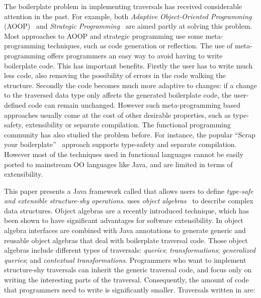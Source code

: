 The boilerplate problem in implementing traversals has
received considerable attention in the past. For example, both
\emph{Adaptive Object-Oriented Programming} (AOOP)~\cite{DemeterBook}
and \emph{Strategic
  Programming}~\cite{borovansky1996elan,visser1998core}
are aimed partly at solving this problem. Most approaches to AOOP and
strategic programming use some meta-programming techniques, such as
code generation or reflection. The use of meta-programming offers
programmers an easy way to avoid having to write boilerplate code.
This has important benefits. Firstly the user has
to write much less code, also removing the possibility of errors in
the code walking the structure. Secondly the code becomes much more
adaptive to changes: if a change to the traversed data type  only affects the generated boilerplate code,  the user-defined code
can remain unchanged.  However such
meta-programming based approaches  usually come at the cost of
other desirable properties, such as type-safety, extensibility or
separate compilation. The functional programming community has also
studied the problem before. For instance,  the popular
``Scrap your boilerplate''~\cite{ralf03syb} approach supports type-safety and separate
compilation.  However most of the techniques used in functional
languages cannot be easily ported to mainstream OO languages like Java, and are
limited in terms of extensibility.

This paper presents a Java framework called \name that allows users to
define \emph{type-safe and extensible structure-shy operations}. \name uses
\emph{object algebras}~\cite{bruno12oa} to describe complex data structures. Object
algebras are a recently introduced technique, which has been shown to
have significant advantages for software extensibility.  In \name
object algebra interfaces are combined with Java annotations to
generate generic and reusable object algebras that deal with
boilerplate traversal code.  Those object algebras include different
types of traversals: \emph{queries}; \emph{transformations};
\emph{generalized queries}; and \emph{contextual transformations}. Programmers
who want to implement structure-shy traversals can inherit the
generic traversal code, and focus only on writing the interesting
parts of the traversal. Consequently, the amount of code that
programmers need to write is significantly smaller.
Traversals
written in \name are:

